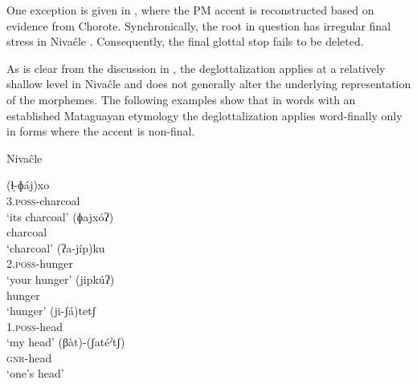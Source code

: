 \begin{exe}
    \ex \mouthits
    \ex \stingerits
    \ex \daughterits
    \ex \coalrel
    \ex \soninlaw
    \ex \welln
    \ex \hunger
    \ex \fryit \label{deg-fryit}
    \ex \arrowkaxe
    \ex \youngersis
    \ex \heartmn
    \ex \sleepiness
    \ex \cavy
    \ex \hear
    \ex \beard
    \ex \distrust
    \ex \eyelash
    \ex \spousewh
    \ex \headits \label{deg-headits}
    \ex \bat
    \ex \dirt
    \ex \pigeon
\end{exe}

One exception is given in , where the PM accent is reconstructed based on evidence from Chorote. Synchronically, the root in question has irregular final stress in Nivaĉle . Consequently, the final glottal stop fails to be deleted.

\begin{exe}
    \ex \mosquito \label{ni-mosq-nodegl}
\end{exe}

As is clear from the discussion in \citet{AnG16c}, the deglottalization applies at a relatively shallow level in Nivaĉle and does not generally alter the underlying representation of the morphemes. The following examples show that in words with an established Mataguayan etymology the deglottalization applies word-finally only in forms where the accent is non-final.

\ea\label{ex:coda-deg-inherited:niv}
Nivaĉle \citep[129, 357, 382]{JS16}\\
    \begin{xlist}
        \ex\gll (ɬ̩-ɸáj)xo\\
                3.\textsc{poss}-charcoal\\
                \glt `its charcoal'
        \ex\gll (ɸajxóʔ)\\
                charcoal\\
                \glt `charcoal'
        \ex\gll (ʔa-jíp)ku\\
                2.\textsc{poss}-hunger\\
                \glt `your hunger'
        \ex\gll (jipkúʔ)\\
                hunger\\
                \glt `hunger'
        \ex\gll (ji-ʃá)tetʃ\\
                1.\textsc{poss}-head\\
                \glt `my head'
        \ex\gll (βàt)-(ʃatéˀtʃ)\\
                {\textsc{gnr}}-head\\
                \glt `one's head'
    \end{xlist}
\z

